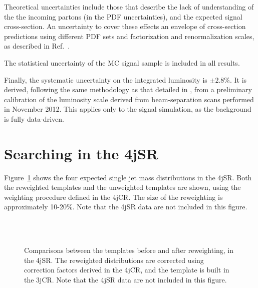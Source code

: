 Theoretical uncertainties include those that describe the lack of understanding of the the incoming partons (in the PDF uncertainties), and the expected signal cross-section. An uncertainty to cover these effects an envelope of cross-section predictions using different PDF sets and factorization and renormalization scales, as described in Ref.~\cite{Kramer:2012bx}. 


The statistical uncertainty of the MC signal sample is included in all results.


Finally, the systematic uncertainty on the integrated luminosity is $\pm2.8\%$. It is derived, following the same methodology as that detailed in \cite{ATLASLumi}, from a preliminary calibration of the luminosity scale derived from beam-separation scans performed in November 2012. This applies only to the signal simulation, as the background is fully data-driven.




\section{Searching in the 4jSR}





Figure~\ref{fig:search:search:4jsr:Reweight} shows the four expected single jet mass distributions in the 4jSR. Both the reweighted templates and the unweighted templates are shown, using the weighting procedure defined in the 4jCR. The size of the reweighting is approximately 10-20\%. Note that the 4jSR data are not included in this figure.

\begin{figure}[!ht]
  \centering
  
  \\
  \\
    
  \caption{Comparisons between the templates before and after reweighting, in the 4jSR. The reweighted distributions are corrected using correction factors derived in the 4jCR, and the template is built in the 3jCR. Note that the 4jSR data are not included in this figure.}
               
  \label{fig:search:search:4jsr:Reweight}
\end{figure}


